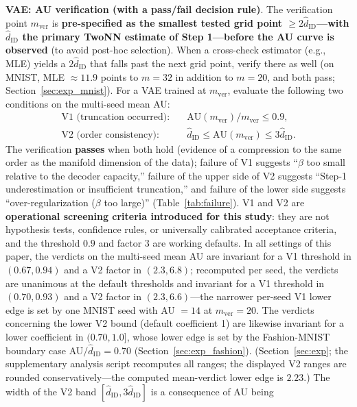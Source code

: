 \documentclass[make,article,submit,pdftex,moreauthors]{Definitions/mdpi}
\newcommand{\hatdID}{\hat{d}_{\mathrm{ID}}}
\begin{document}
\textbf{VAE: AU verification (with a pass/fail decision rule)}.
The verification point $m_{\mathrm{ver}}$ is \textbf{pre-specified as the
smallest tested grid point $\geq 2\hatdID$---with $\hatdID$ the primary
TwoNN estimate of Step 1---before the AU curve is observed} (to avoid
post-hoc selection).
When a cross-check estimator (e.g., MLE) yields a $2\hatdID$ that falls
past the next grid point, verify there as well (on MNIST, MLE
$\approx 11.9$ points to $m = 32$ in addition to $m = 20$, and both pass;
Section~\ref{sec:exp_mnist}).
For a VAE trained at $m_{\mathrm{ver}}$, evaluate the following two
conditions on the multi-seed mean AU:
\begin{align}
  \text{V1 (truncation occurred)}:&\quad
  \mathrm{AU}(m_{\mathrm{ver}}) / m_{\mathrm{ver}} \leq 0.9,
  \label{eq:rule_v1}\\
  \text{V2 (order consistency)}:&\quad
  \hatdID \leq \mathrm{AU}(m_{\mathrm{ver}}) \leq 3\hatdID.
  \label{eq:rule_v2}
\end{align}
The verification \textbf{passes} when both hold (evidence of a compression
to the same order as the manifold dimension of the data);
failure of V1 suggests ``$\beta$ too small relative to the decoder
capacity,'' failure of the upper side of V2 suggests ``Step-1
underestimation or insufficient truncation,'' and failure of the lower side
suggests ``over-regularization ($\beta$ too large)''
(Table~\ref{tab:failure}).
V1 and V2 are \textbf{operational screening criteria introduced for this
study}: they are not hypothesis tests, confidence rules, or universally
calibrated acceptance criteria, and the threshold $0.9$ and factor $3$ are
working defaults.
In all settings of this paper, the verdicts on the multi-seed mean AU are
invariant for a V1 threshold in $(0.67, 0.94)$ and a V2 factor in
$(2.3, 6.8)$; recomputed per seed, the verdicts are unanimous at the
default thresholds and invariant for a V1 threshold in $(0.70, 0.93)$ and
a V2 factor in $(2.3, 6.6)$---the narrower per-seed V1 lower edge is set by
one MNIST seed with AU $= 14$ at $m_{\mathrm{ver}} = 20$.
The verdicts concerning the lower V2 bound (default coefficient 1) are
likewise invariant for a lower coefficient in $(0.70, 1.0]$, whose lower
edge is set by the Fashion-MNIST boundary case AU$/\hatdID = 0.70$
(Section~\ref{sec:exp_fashion}).
(Section~\ref{sec:exp}; the supplementary analysis script recomputes all
ranges; the displayed V2 ranges are rounded conservatively---the computed
mean-verdict lower edge is $2.23$.)
The width of the V2 band $[\hatdID, 3\hatdID]$ is a consequence of AU being
\end{document}
